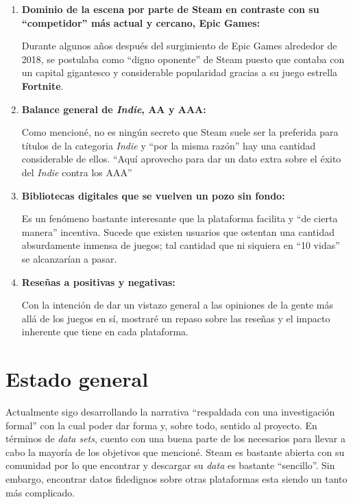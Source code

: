 \documentclass[12pt, letterpaper]{article}
\begin{document}
\begin{enumerate}
    \item \textbf{Dominio de la escena por parte de Steam en contraste con su \enquote{competidor} más actual y cercano, Epic Games:}

        Durante algunos años después del surgimiento de Epic Games alrededor de 2018, se postulaba como \enquote{digno oponente} de Steam puesto que contaba con un capital gigantesco y considerable popularidad gracias a su juego estrella \textbf{Fortnite}.

        \vspace{0.5cm}
    \item \textbf{Balance general de \textit{Indie}, AA y AAA:}

        Como mencioné, no es ningún secreto que Steam suele ser la preferida para títulos de la categoria \textit{Indie} y \enquote{por la misma razón} hay una cantidad considerable de ellos. \enquote{Aquí aprovecho para dar un dato extra sobre el éxito del \textit{Indie} contra los AAA}

        \vspace{0.5cm}
    \item \textbf{Bibliotecas digitales que se vuelven un pozo sin fondo:} 
    
        Es un fenómeno bastante interesante que la plataforma facilita y \enquote{de cierta manera} incentiva. Sucede que existen usuarios que ostentan una cantidad absurdamente inmensa de juegos; tal cantidad que ni siquiera en \enquote{10 vidas} se alcanzarían a pasar. 

        \vspace{0.5cm}
    \item \textbf{Reseñas a positivas y negativas:}
    
        Con la intención de dar un vistazo general a las opiniones de la gente más allá de los juegos en sí, mostraré un repaso sobre las reseñas y el impacto inherente que tiene en cada plataforma. 
\end{enumerate}

\newpage
\section{Estado general}
Actualmente sigo desarrollando la narrativa \enquote{respaldada con una investigación formal} con la cual poder dar forma y, sobre todo, sentido al proyecto. En términos de \textit{data sets}, cuento con una buena parte de los necesarios para llevar a cabo la mayoría de los objetivos que mencioné. Steam es bastante abierta con su comunidad por lo que encontrar y descargar su \textit{data} es bastante \enquote{sencillo}. Sin embargo, encontrar datos fidedignos sobre otras plataformas esta siendo un tanto más complicado.
\end{document}
